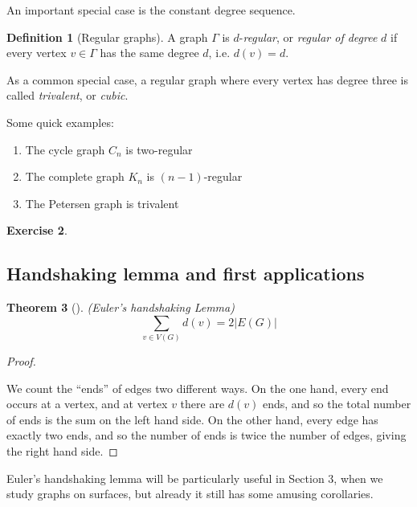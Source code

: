 \documentclass[10pt,]{book}
\theoremstyle{plain}
\newtheorem{theorem}{Theorem}[section]
\theoremstyle{definition}
\newtheorem{definition}[theorem]{Definition}
\theoremstyle{definition}
\theoremstyle{definition}
\newtheorem{exercise}[theorem]{Exercise}
\begin{document}
\par
\hypertarget{p-29}{}%
An important special case is the constant degree sequence.%
\begin{definition}[{Regular graphs}]\label{definition-8}
\hypertarget{p-30}{}%
A graph \(\Gamma\) is \(d\)-\emph{regular}, or \emph{regular of degree} \(d\) if every vertex \(v\in\Gamma\) has the same degree \(d\), i.e. \(d(v)=d\).%
\end{definition}
\hypertarget{p-31}{}%
As a common special case, a regular graph where every vertex has degree three is called \emph{trivalent}, or \emph{cubic}.%
\par
\hypertarget{p-32}{}%
Some quick examples: \leavevmode%
\begin{enumerate}
\item\hypertarget{li-8}{}The cycle graph \(C_n\) is two-regular%
\item\hypertarget{li-9}{}The complete graph \(K_n\) is \((n-1)\)-regular%
\item\hypertarget{li-10}{}The Petersen graph is trivalent%
\end{enumerate}
%
\begin{exercise}\label{exercise-1}
\end{exercise}
\typeout{************************************************}
\typeout{************************************************}
\subsection[{Handshaking lemma and first applications}]{Handshaking lemma and first applications}\label{subsection-6}
\begin{theorem}[{}]\label{theorem-1}
\hypertarget{p-34}{}%
(Euler's handshaking Lemma)%
%
\begin{equation*}
\sum_{v\in V(G)}d(v)=2|E(G)|
\end{equation*}
\end{theorem}
\begin{proof}\hypertarget{proof-1}{}
\hypertarget{p-35}{}%
We count the ``ends'' of edges two different ways.  On the one hand, every end occurs at a vertex, and at vertex \(v\) there are \(d(v)\) ends, and so the total number of ends is the sum on the left hand side. On the other hand, every edge has exactly two ends, and so the number of ends is twice the number of edges, giving the right hand side.%
\end{proof}
\hypertarget{p-36}{}%
Euler's handshaking lemma will be particularly useful in Section 3, when we study graphs on surfaces, but already it still has some amusing corollaries.%
\typeout{************************************************}
\typeout{************************************************}
\end{document}
